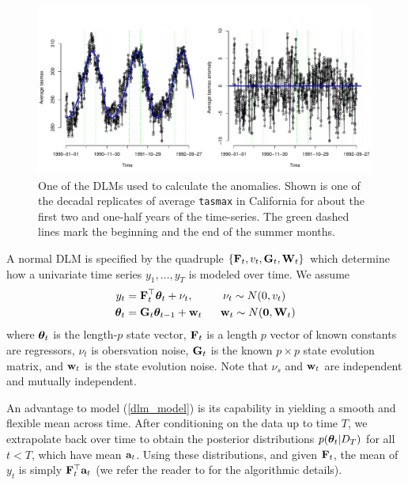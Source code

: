 \begin{figure}
\begin{center}
\includegraphics[scale=0.50]{figs/dlm.pdf}
\end{center}
\caption{One of the DLMs used to calculate the anomalies. Shown is one of the decadal replicates of average \texttt{tasmax} in California for about the first two and one-half years of the time-series. The green dashed lines mark the beginning and the end of the summer months.}
\label{dlm_fig}
\end{figure}


A normal DLM is specified by the quadruple $\{\mathbf{\bm{F}}_t, v_t, \mathbf{\bm{G}}_t, \mathbf{\bm{W}}_t\}$ which determine how a univariate time series $y_1,\ldots,y_T$ is modeled over time. We assume
\begin{align}
y_t &= \mathbf{\bm{F}}_t^\top\mathbf{\bm{\theta}}_t + \nu_t, ~~~~~~~~ \nu_t\sim N(0, v_t) \label{dlm_model} \\
\mathbf{\bm{\theta}}_t &= \mathbf{\bm{G}}_t\mathbf{\bm{\theta}}_{t-1}+\mathbf{\bm{w}}_t ~~~~~ \mathbf{\bm{w}}_t\sim N(\mathbf{\bm{0}}, \mathbf{\bm{W}}_t) \nonumber
\end{align}
where $\mathbf{\bm{\theta}}_t$ is the length-$p$ state vector, $\mathbf{\bm{F}}_t$ is a length $p$ vector of known constants are regressors, $\nu_t$ is obersvation noise, $\mathbf{\bm{G}}_t$ is the known $p\times p$ state evolution matrix, and $\mathbf{\bm{w}}_t$ is the state evolution noise. Note that $\nu_s$ and $\mathbf{\bm{w}}_t$ are independent and mutually independent.

An advantage to model (\ref{dlm_model}) is its capability in yielding a smooth and flexible mean across time. After conditioning on the data up to time $T$, we extrapolate back over time to obtain the posterior distributions $p(\mathbf{\bm{\theta}}_t|D_T)$ for all $t<T$, which have mean $\mathbf{\bm{a}}_t$. Using these distributions, and given $\mathbf{\bm{F}}_t$, the mean of $y_t$ is simply $\mathbf{\bm{F}}_t^\top\mathbf{\bm{a}}_t$ (we refer the reader to \cite{prado2010time} for the algorithmic details).


